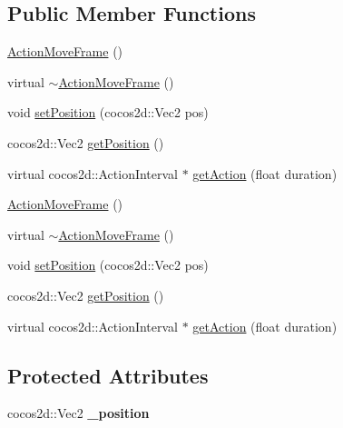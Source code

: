 \subsection*{Public Member Functions}
\begin{DoxyCompactItemize}
\item 
\hyperlink{classcocostudio_1_1ActionMoveFrame_a5fa55f958e6083638c86b9db5a3385f1}{Action\+Move\+Frame} ()
\item 
virtual \hyperlink{classcocostudio_1_1ActionMoveFrame_a956695154ea2ba7ec1d81aec8589360f}{$\sim$\+Action\+Move\+Frame} ()
\item 
void \hyperlink{classcocostudio_1_1ActionMoveFrame_ae4f9685c1b3fdd9e6d50d90729013e03}{set\+Position} (cocos2d\+::\+Vec2 pos)
\item 
cocos2d\+::\+Vec2 \hyperlink{classcocostudio_1_1ActionMoveFrame_a29d4eca3655e5c12062b5447ee89fbfa}{get\+Position} ()
\item 
virtual cocos2d\+::\+Action\+Interval $\ast$ \hyperlink{classcocostudio_1_1ActionMoveFrame_a57f58bf872a13797b7b121c0bb40793e}{get\+Action} (float duration)
\item 
\hyperlink{classcocostudio_1_1ActionMoveFrame_a5fa55f958e6083638c86b9db5a3385f1}{Action\+Move\+Frame} ()
\item 
virtual \hyperlink{classcocostudio_1_1ActionMoveFrame_a7ce6d81b1e9f9e9a0a9059902515a005}{$\sim$\+Action\+Move\+Frame} ()
\item 
void \hyperlink{classcocostudio_1_1ActionMoveFrame_ae4f9685c1b3fdd9e6d50d90729013e03}{set\+Position} (cocos2d\+::\+Vec2 pos)
\item 
cocos2d\+::\+Vec2 \hyperlink{classcocostudio_1_1ActionMoveFrame_a68dc486d34f7127625b6cacb4388b973}{get\+Position} ()
\item 
virtual cocos2d\+::\+Action\+Interval $\ast$ \hyperlink{classcocostudio_1_1ActionMoveFrame_acdacf22506bf13d5214f70d25b7cfed8}{get\+Action} (float duration)
\end{DoxyCompactItemize}
\subsection*{Protected Attributes}
\begin{DoxyCompactItemize}
\item 
\mbox{\label{classcocostudio_1_1ActionMoveFrame_a699bbac53b9a31e826a84fba7f206a19}} 
cocos2d\+::\+Vec2 {\bfseries \+\_\+position}
\end{DoxyCompactItemize}
